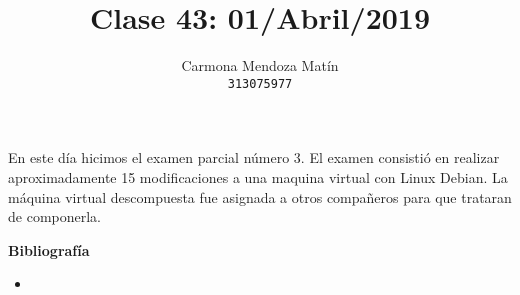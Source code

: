 \documentclass[11pt, a4paper]{report}
\begin{document}
\title{Clase 43: 01/Abril/2019}
\author{
  Carmona Mendoza Mat\'in\\
  \texttt{313075977}
}
\date{}
\maketitle

En este día hicimos el examen parcial número 3. El examen consistió en realizar
aproximadamente 15 modificaciones a una maquina virtual con Linux Debian. La
máquina virtual descompuesta fue asignada a otros compañeros para que trataran
de componerla. 

\newpage

\textbf{Bibliografía} \\

\begin{itemize}

\item \url{}
\end{itemize}
\end{document}
